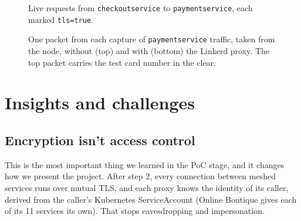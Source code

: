 \documentclass[12pt,a4paper]{article}
\begin{document}
\begin{figure}[p]
  \centering
  \caption{Connections between Online Boutique deployments as reported by
    \texttt{linkerd viz edges}. The rows for the \texttt{linkerd-viz}
    Prometheus are left out; they are secured as well.}
  \label{fig:edges}

  \vspace{1em}
  \caption{Live requests from \texttt{checkoutservice} to
    \texttt{paymentservice}, each marked \texttt{tls=true}.}
  \label{fig:tap}
\end{figure}

\begin{figure}[p]
  \centering

  \vspace{1em}
  \caption{One packet from each capture of \texttt{paymentservice} traffic,
    taken from the node, without (top) and with (bottom) the Linkerd proxy.
    The top packet carries the test card number in the clear.}
  \label{fig:capture}
\end{figure}

\section{Insights and challenges}

\subsection*{Encryption isn't access control}

This is the most important thing we learned in the PoC stage, and it changes
how we present the project. After step 2, every connection between meshed
services runs over mutual TLS, and each proxy knows the identity of its
caller, derived from the caller's Kubernetes ServiceAccount (Online Boutique
gives each of its 11 services its own). That stops eavesdropping and
impersonation.
\end{document}

